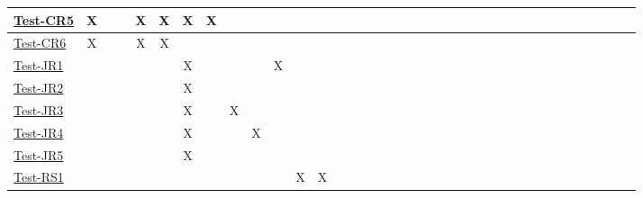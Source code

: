 \documentclass[12pt, titlepage]{article}
\begin{document}
\begin{landscape}
\begin{table}[H]
\begin{adjustwidth}{-0.1in}{-1in}
{\begin{tabular}{|c|c|c|c|c|c|c|c|c|c|c|c|c|c|c|c|c|l|l|l|l|l|l|l|l|l|l|l|l|l|l|l|l|l|l|l|l|}
\multicolumn{1}{|l|}{\hyperref[itm:Test-CR5]{Test-CR5}}   &             X&              &             &             X&     X        &        X      &       X       &             &              &              &             &             &              &              &              &                & & & & & & & & &\\ \hline
\multicolumn{1}{|l|}{\hyperref[itm:Test-CR6]{Test-CR6}}   &              X&              &              &             X&     X         &             &             &             &              &              &              &             &              &              &              &                & & & & & & & & &\\ \hline
\multicolumn{1}{|l|}{\hyperref[itm:Test-JR1]{Test-JR1}}   &             &             &             &              &             &              X&              &             &              &              X&              &              &              &              &              &                & & & & & & & & &\\ \hline
\multicolumn{1}{|l|}{\hyperref[itm:Test-JR2]{Test-JR2}}   &             &              &             &             &             &              X&              &             &              &              &             &             &              &              &              &                & & & & & & & & &\\ \hline
\multicolumn{1}{|l|}{\hyperref[itm:Test-JR3]{Test-JR3}}   &             &             &             &              &             &              X&              &             X&              &              &              &             &              &              &              &                & & & & & & & & &\\ \hline
\multicolumn{1}{|l|}{\hyperref[itm:Test-JR4]{Test-JR4}}   &             &             &             &              &             &              X&              &             &              X&              &             &             &              &              &              &                & & & & & & & & &\\ \hline
\multicolumn{1}{|l|}{\hyperref[itm:Test-JR5]{Test-JR5}}   &             &              &             &             &             &              X&              &             &              &              &             &             &              &              &              &                & & & & & & & & &\\ \hline
\multicolumn{1}{|l|}{\hyperref[itm:Test-RS1]{Test-RS1}}   &             &             &             &              &             &              &              &             &              &              &              X&              X&              &              &              &                & & & & & & & & &\\ \hline

\end{tabular}}
\end{adjustwidth}
\end{table}
\end{landscape}
\end{document}
